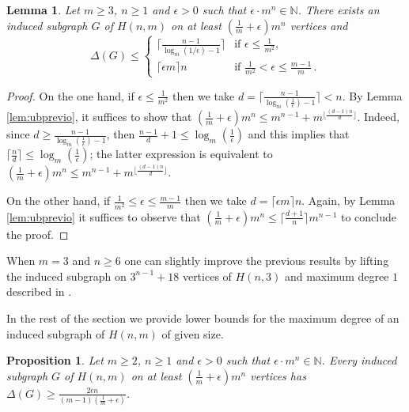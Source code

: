 \documentclass[a4paper,10pt]{amsart}
\newtheorem{prop}[thm]{Proposition}
\newtheorem{lem}[thm]{Lemma}
\begin{document}
\begin{lem}\label{lem:ub}
    Let $m\geq 3$, $n\geq 1$ and $\epsilon>0$ such that $\epsilon\cdot m^n\in\mathbb N$. There exists an induced subgraph $G$ of $H(n,m)$ on at least $\left(\frac{1}{m}+\epsilon\right)m^n$ vertices and 
\[\Delta(G) \leq \begin{cases}  \lceil\frac{n-1}{ \log_m (1/\epsilon)-1}\rceil & \text{if } \epsilon \leq \frac{1}{m^2},\\
\lceil \epsilon m \rceil n& \text{if } \frac{1}{m^2}  < \epsilon \leq \frac{m-1}{m}\, . \end{cases}  \]
\end{lem}
\begin{proof}
     On the one hand, if $\epsilon\leq \frac{1}{m^2}$ then we take $d=\lceil\frac{n-1}{\log_m(\frac{1}{\epsilon})-1}\rceil < n$. By Lemma \ref{lem:ubprevio}, it suffices to show that $(\frac{1}{m}+\epsilon)m^n\leq m^{n-1}+m^{\lfloor\frac{(d-1)n}{d}\rfloor}$.
     Indeed, since $d\geq \frac{n-1}{\log_m(\frac{1}{\epsilon})-1}$, then $\frac{n-1}{d}+1\leq\log_m(\frac{1}{\epsilon})$ and this implies that $\lceil\frac{n}{d}\rceil\leq\log_m(\frac{1}{\epsilon})$; the latter expression is equivalent to $(\frac{1}{m}+\epsilon)m^n\leq m^{n-1}+m^{\lfloor \frac{(d-1)n}{d}\rfloor}$.

     On the other hand, if $\frac{1}{m^2}\leq\epsilon\leq\frac{m-1}{m}$ then we take $d=\lceil\epsilon m\rceil n$. Again, by Lemma \ref{lem:ubprevio} it suffices to observe that $(\frac{1}{m}+\epsilon)m^n\leq \lceil\frac{d+1}{n}\rceil m^{n-1}$ to conclude the proof.
\end{proof}



When $m = 3$ and $n \geq 6$ one can slightly improve the previous results by lifting the induced subgraph on $3^{n-1}+18$ vertices of $H(n,3)$ and maximum degree $1$ described in \cite{PT24}.

In the rest of the section we provide lower bounds for the maximum degree of an induced subgraph of $H(n,m)$ of given size.


\begin{prop}\label{prop:lb}
    Let $m\geq 2$, $n\geq 1$ and $\epsilon>0$ such that $\epsilon\cdot m^n\in\mathbb N$. Every induced subgraph $G$ of $H(n,m)$ on at least $(\frac{1}{m}+\epsilon)m^n$ vertices has $\Delta(G)\geq \frac{2\epsilon n}{(m-1)(\frac{1}{m}+\epsilon)}$.
\end{prop}
\end{document}
